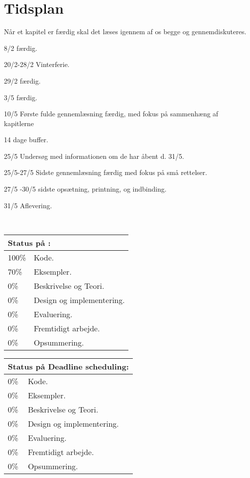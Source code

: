 \chapter{Tidsplan}
Når et kapitel er færdig skal det læses igennem af os begge og gennemdiskuteres.
\begin{list}{}{}
\tightlist 
\item [8/2] \des færdig.
\item [20/2-28/2] Vinterferie.
\item [29/2] \ds færdig.
\item [3/5] \is færdig.
\item [10/5] Første fulde gennemlæsning færdig, med fokus på sammenhæng af kapitlerne
\item [14 dage buffer.]
\item[25/5] Undersøg med informationen om de har åbent d. 31/5.
\item [25/5-27/5] Sidste gennemlæsning færdig med fokus på små rettelser.
\item [27/5 -30/5] sidste opsætning, printning, og indbinding.
\item [31/5] Aflevering. 
\end{list}\
\begin{tabular}{m{0.5cm}m{4cm}}
\hline  
\multicolumn{2}{m{4.5cm}}{\textbf{Status på \des:}} \\
\hline
100\% & Kode.  \\ 
70\% & Eksempler.\\
0\% & Beskrivelse og Teori.\\
0\% & Design og  implementering. \\
0\% & Evaluering. \\
0\% & Fremtidigt arbejde. \\
0\% & Opsummering. \\ 
\hline
\end{tabular}
\quad
\begin{tabular}{m{0.5cm}m{4cm}}
\hline  
\multicolumn{2}{m{4.5cm}}{\textbf{Status på Deadline scheduling:}} \\
\hline
0\% & Kode.  \\ 
0\% & Eksempler.\\
0\% & Beskrivelse og Teori.\\
0\% & Design og  implementering. \\
0\% & Evaluering. \\
0\% & Fremtidigt arbejde. \\
0\% & Opsummering. \\ 
\hline
\end{tabular}\\

